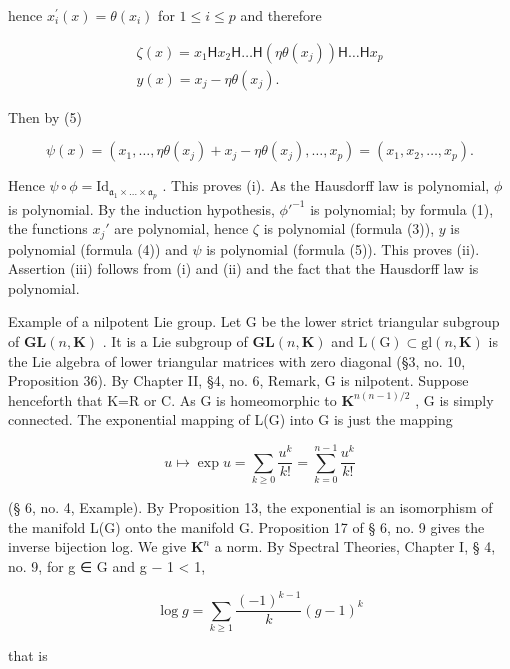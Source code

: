 hence \(x_{i}^{\prime}(x) = \theta (x_{i})\) for \(1\leqslant i\leqslant p\) and therefore

\[
\begin{array}{c} \zeta (x) = x _ {1} \mathsf {H} x _ {2} \mathsf {H} \dots \mathsf {H} (\eta \theta (x _ {j})) \mathsf {H} \dots \mathsf {H} x _ {p} \\ y (x) = x _ {j} - \eta \theta (x _ {j}). \end{array}
\]

Then by (5)

\[
\psi (x) = \left(x _ {1}, \dots , \eta \theta \left(x _ {j}\right) + x _ {j} - \eta \theta \left(x _ {j}\right), \dots , x _ {p}\right) = \left(x _ {1}, x _ {2}, \dots , x _ {p}\right).
\]

Hence \(\psi \circ \phi = \mathrm{Id}_{\mathfrak{a}_1 \times \ldots \times \mathfrak{a}_p}\) . This proves (i). As the Hausdorff law is polynomial, \(\phi\) is polynomial. By the induction hypothesis, \(\phi'^{-1}\) is polynomial; by formula (1), the functions \(x_j'\) are polynomial, hence \(\zeta\) is polynomial (formula (3)), \(y\) is polynomial (formula (4)) and \(\psi\) is polynomial (formula (5)). This proves (ii). Assertion (iii) follows from (i) and (ii) and the fact that the Hausdorff law is polynomial.

Example of a nilpotent Lie group. Let G be the lower strict triangular subgroup of \(\mathbf{GL}(n,\mathbf{K})\) . It is a Lie subgroup of \(\mathbf{GL}(n,\mathbf{K})\) and \(\mathrm{L}(\mathrm{G})\subset\mathrm{gl}(n,\mathbf{K})\) is the Lie algebra of lower triangular matrices with zero diagonal (§3, no. 10, Proposition 36). By Chapter II, §4, no. 6, Remark, G is nilpotent. Suppose henceforth that K=R or C. As G is homeomorphic to \(\mathbf{K}^{n(n-1)/2}\) , G is simply connected. The exponential mapping of L(G) into G is just the mapping

\[
u \mapsto \exp u = \sum_ {k \geqslant 0} \frac {u ^ {k}}{k !} = \sum_ {k = 0} ^ {n - 1} \frac {u ^ {k}}{k !}
\]

(§ 6, no. 4, Example). By Proposition 13, the exponential is an isomorphism of the manifold L(G) onto the manifold G. Proposition 17 of § 6, no. 9 gives the inverse bijection log. We give \(\mathbf{K}^{n}\) a norm. By Spectral Theories, Chapter I, § 4, no. 9, for g ∈ G and \textbar\textbar g − 1\textbar\textbar{} \textless{} 1,

\[
\log g = \sum_ {k \geqslant 1} \frac {(- 1) ^ {k - 1}}{k} (g - 1) ^ {k}
\]

that is

